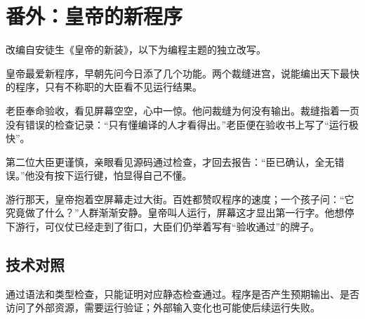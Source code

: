 \section{番外：皇帝的新程序}

改编自安徒生《皇帝的新装》，以下为编程主题的独立改写。

皇帝最爱新程序，早朝先问今日添了几个功能。两个裁缝进宫，说能编出天下最快的程序，只有不称职的大臣看不见运行结果。

老臣奉命验收，看见屏幕空空，心中一惊。他问裁缝为何没有输出。裁缝指着一页没有错误的检查记录：“只有懂编译的人才看得出。”老臣便在验收书上写了“运行极快”。

第二位大臣更谨慎，亲眼看见源码通过检查，才回去报告：“臣已确认，全无错误。”他没有按下运行键，怕显得自己不懂。

游行那天，皇帝抱着空屏幕走过大街。百姓都赞叹程序的速度；一个孩子问：“它究竟做了什么？”人群渐渐安静。皇帝叫人运行，屏幕这才显出第一行字。他想停下游行，可仪仗已经走到了街口，大臣们仍举着写有“验收通过”的牌子。

\subsection*{技术对照}

通过语法和类型检查，只能证明对应静态检查通过。程序是否产生预期输出、是否访问了外部资源，需要运行验证；外部输入变化也可能使后续运行失败。
